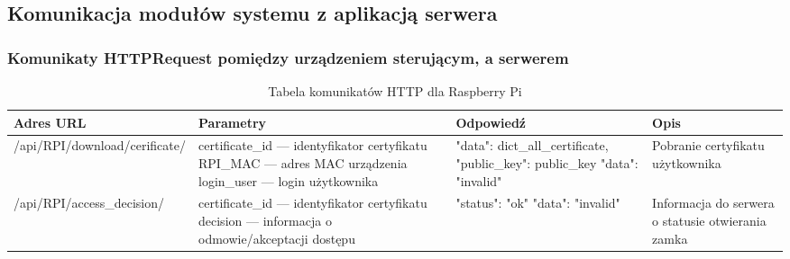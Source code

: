 \subsection{Komunikacja modułów systemu z aplikacją  serwera}
	\begin{landscape}
			\subsubsection{Komunikaty HTTPRequest pomiędzy urządzeniem sterującym, a serwerem}

		
		\begin{longtable}[!ht]{|p{5cm}|p{6cm}|p{6.5cm}|p{3cm}|} 
			\caption{Tabela komunikatów HTTP dla Raspberry Pi}
			\label{tab:http_raspberry}\\
			\hline	
			Adres URL & Parametry & Odpowiedź & Opis \\	\hline
			/api/RPI/download/cerificate/ & certificate\_id --- identyfikator certyfikatu \newline RPI\_MAC --- adres MAC urządzenia \newline login\_user --- login użytkownika & "data": dict\_all\_certificate, "public\_key": public\_key \tablinia "data": "invalid" & Pobranie certyfikatu użytkownika \\ \hline
			/api/RPI/access\_decision/ & certificate\_id --- identyfikator certyfikatu \newline decision --- informacja o odmowie/akceptacji dostępu & "status": "ok" \tablinia "data": "invalid" & Informacja do serwera o statusie otwierania zamka \\ \hline
		\end{longtable}
	\end{landscape}
\newpage
